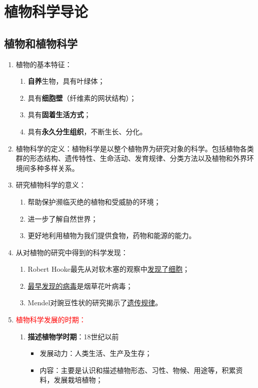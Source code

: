 \chapter{植物科学导论}
\section{植物和植物科学}
\begin{enumerate}
    \item 植物的基本特征：
    \begin{enumerate}
        \item \textbf{自养}生物，具有叶绿体；
        \item 具有\textbf{细胞壁}（纤维素的网状结构）；
        \item 具有\textbf{固着生活方式}；
        \item 具有\textbf{永久分生组织}，不断生长、分化。
    \end{enumerate}
    \item 植物科学的定义：植物科学是以整个植物界为研究对象的科学。包括植物各类群的形态结构、遗传特性、生命活动、发育规律、分类方法以及植物和外界环境间多种多样关系。
    \item 研究植物科学的意义：
    \begin{enumerate}
        \item 帮助保护濒临灭绝的植物和受威胁的环境；
        \item 进一步了解自然世界；
        \item 更好地利用植物为我们提供食物，药物和能源的能力。
    \end{enumerate}
    \item 从对植物的研究中得到的科学发现：
    \begin{enumerate}
        \item Robert Hooke最先从对软木塞的观察中\uline{发现了细胞}；
        \item \uline{最早发现的病毒}是烟草花叶病毒；
        \item Mendel对豌豆性状的研究揭示了\uline{遗传规律}。
    \end{enumerate}
    \item \textcolor{red}{植物科学发展的时期：}
    \begin{enumerate}
        \item \textbf{描述植物学时期}：18世纪以前
        \begin{itemize}
            \item 发展动力：人类生活、生产及生存；
            \item 内容：主要是认识和描述植物形态、习性、物候、用途等，积累资料，发展栽培植物；

\end{itemize}
\end{enumerate}
\end{enumerate}
